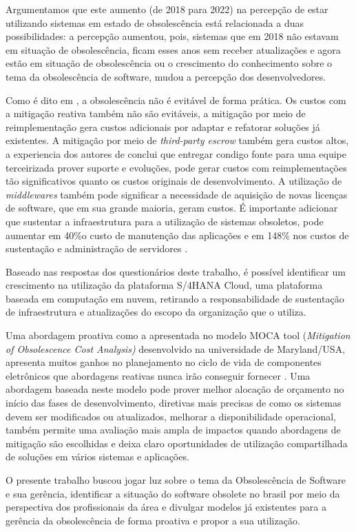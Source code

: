 Argumentamos que este aumento (de 2018 para 2022) na percepção de estar utilizando sistemas em estado de obsolescência está relacionada a duas possibilidades: a percepção aumentou, pois, sistemas que em 2018 não estavam em situação de obsolescência, ficam esses anos sem receber atualizações e agora estão em situação de obsolescência ou o crescimento do conhecimento sobre o tema da obsolescência de software, mudou a percepção dos desenvolvedores.

Como é dito em , a obsolescência não é evitável de forma prática. Os custos com a mitigação reativa também não são evitáveis, a mitigação por meio de reimplementação gera custos adicionais por adaptar e refatorar soluções já existentes. A mitigação por meio de \textit{third-party escrow} também gera custos altos, a experiencia dos autores de  conclui que entregar condigo fonte para uma equipe terceirizada prover suporte e evoluções, pode gerar custos com reimplementações tão significativos quanto os custos originais de desenvolvimento. A utilização de \textit{middlewares} também pode significar a necessidade de aquisição de novas licenças de software, que em sua grande maioria, geram custos. É importante adicionar que sustentar a infraestrutura para a utilização de sistemas obsoletos, pode aumentar em 40\%o custo de manutenção das aplicações e em 148\% nos custos de sustentação e administração de servidores \cite{idc2016}.

Baseado nas respostas dos questionários deste trabalho, é possível identificar um crescimento na utilização da plataforma S/4HANA Cloud, uma plataforma baseada em computação em nuvem, retirando a responsabilidade de sustentação de infraestrutura e atualizações do escopo da organização que o utiliza.

Uma abordagem proativa como a apresentada no modelo MOCA tool (\textit{Mitigation of
Obsolescence Cost Analysis)} \cite{moca} desenvolvido na universidade de Maryland/USA, apresenta muitos ganhos no planejamento no ciclo de vida de componentes eletrônicos que abordagens reativas nunca irão conseguir fornecer \cite{dmsmscenter2004}. Uma abordagem baseada neste modelo pode prover melhor alocação de orçamento no início das fases de desenvolvimento, diretivas mais precisas de como os sistemas devem ser modificados ou atualizados, melhorar a disponibilidade operacional, também permite uma avaliação mais ampla de impactos quando abordagens de mitigação são escolhidas e deixa claro oportunidades de utilização compartilhada de soluções em vários sistemas e aplicações.

O presente trabalho buscou jogar luz sobre o tema da Obsolescência de Software e sua gerência, identificar a situação do software obsolete no brasil por meio da perspectiva dos profissionais da área e divulgar modelos já existentes para a gerência da obsolescência de forma proativa e propor a sua utilização. 




